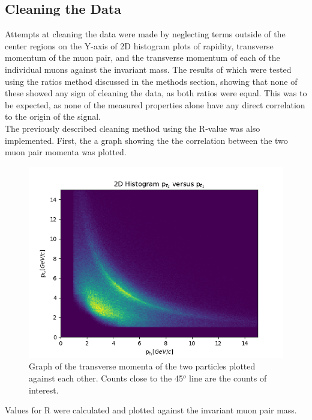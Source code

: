 
\subsection*{Cleaning the Data}

Attempts at cleaning the data were made by neglecting terms outside of the
center regions on the Y-axis of 2D histogram plots of rapidity, transverse momentum of the muon pair, and the transverse momentum of each of
the individual muons against the invariant mass. The results of which were tested using the ratios method discussed in the methods section, showing that none of these showed any sign of cleaning the data, as both ratios were equal. This was to be expected, as none of the measured properties alone have any direct correlation to the origin of the signal. \\

The previously described cleaning method using the R-value was also implemented. First, the a graph showing the the correlation between the two muon pair momenta was plotted.

\begin{figure}[H]
\centering
\includegraphics[width=0.7\columnwidth]{figures/mom_tran_1_2_2d_hist.png}
\caption{Graph of the transverse momenta of the two particles plotted against each other. Counts close to the 45$^o$ line are the counts of interest.}
\label{fig:2d_hists_ex}
\end{figure}

Values for R were calculated and plotted against the invariant muon pair mass.

